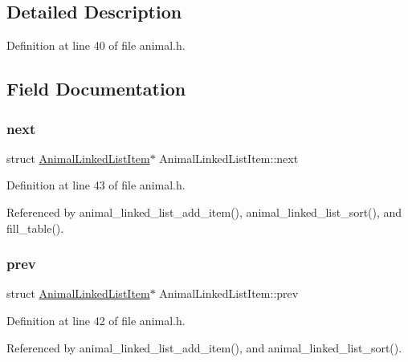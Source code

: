 \subsection{Detailed Description}


Definition at line 40 of file animal.\+h.



\subsection{Field Documentation}
\mbox{\label{struct_animal_linked_list_item_a06cafc1028de611d48fcbe0ead6317ad}} 
\subsubsection{\texorpdfstring{next}{next}}
{\footnotesize\ttfamily struct \mbox{\hyperlink{struct_animal_linked_list_item}{Animal\+Linked\+List\+Item}}$\ast$ Animal\+Linked\+List\+Item\+::next}



Definition at line 43 of file animal.\+h.



Referenced by animal\+\_\+linked\+\_\+list\+\_\+add\+\_\+item(), animal\+\_\+linked\+\_\+list\+\_\+sort(), and fill\+\_\+table().

\mbox{\label{struct_animal_linked_list_item_ae9af6eb05ab6a7b59e2ad01ded9873bd}} 
\subsubsection{\texorpdfstring{prev}{prev}}
{\footnotesize\ttfamily struct \mbox{\hyperlink{struct_animal_linked_list_item}{Animal\+Linked\+List\+Item}}$\ast$ Animal\+Linked\+List\+Item\+::prev}



Definition at line 42 of file animal.\+h.



Referenced by animal\+\_\+linked\+\_\+list\+\_\+add\+\_\+item(), and animal\+\_\+linked\+\_\+list\+\_\+sort().

